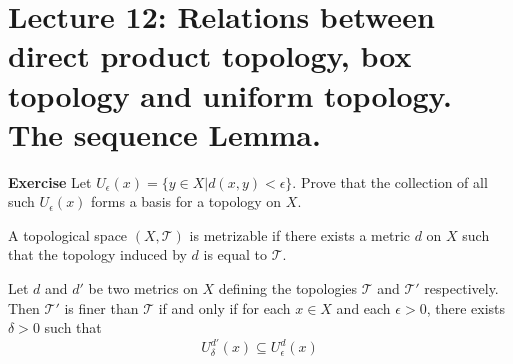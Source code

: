 \documentclass[main.tex]{subfiles}
\begin{document}
\pagestyle{plain}
\setcounter{chapter}{11}

\chapter{Lecture 12: Relations between direct product topology, box topology and uniform topology. The sequence Lemma. }
\label{chap:chapter12}

\par \noindent \textbf{Exercise} Let $U_{\epsilon}(x) = \{y\in X| d(x, y) < \epsilon\}$. Prove that the collection of all such $U_{\epsilon}(x)$ forms a basis for a topology on $X$. 
\begin{definition}
    A topological space $(X, \mathcal{T})$ is metrizable if there exists a metric $d$ on $X$ such that the topology induced by $d$ is equal to $\mathcal{T}$.
\end{definition} 

\begin{lemma}
    Let $d$ and $d'$ be two metrics on $X$ defining the topologies $\mathcal{T}$ and $\mathcal{T}'$ respectively. Then $\mathcal{T}'$ is finer than $\mathcal{T}$ if and only if for each $x \in X$ and each $\epsilon > 0$, there exists $\delta > 0$ such that 
    \begin{equation}
        U_{\delta}^{d'}(x) \subseteq U_{\epsilon}^{d}(x)
    \end{equation}
\end{lemma}
\end{document}
